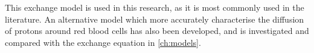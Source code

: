 This exchange model is used in this research, as it is most commonly used in the literature.
An alternative model which more accurately characterise the diffusion of protons around red blood cells has also been developed\cite{JensenNMRrelaxationtissues2000}, and is investigated and compared with the exchange equation in \autoref{ch:models}.

